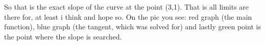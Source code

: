 \documentclass[11p]{article}
\begin{document}
So that is the exact slope of the curve at the point (3,1). That is all limits
are there for, at least i think and hope so. On the pic you see: red graph (the
main function), blue graph (the tangent, which was solved for) and lastly green
point is the point where the slope is searched.
\end{document}
